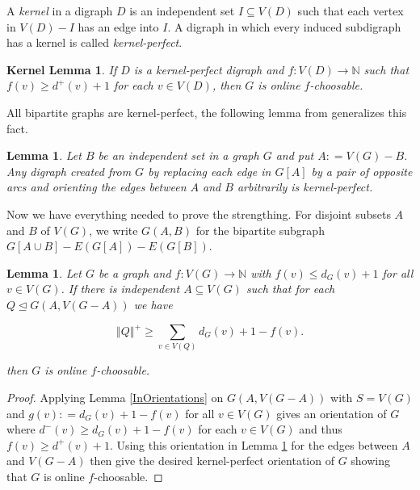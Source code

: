 \documentclass[12pt]{article}
\theoremstyle{plain}
\newtheorem{lem}[thm]{Lemma}
\newtheorem*{KernelLemma}{Kernel Lemma}
\theoremstyle{definition}
\theoremstyle{remark}
\newcommand{\IN}{\mathbb{N}}
\newcommand{\size}[1]{\left\Vert#1\right\Vert}
\newcommand{\func}[3]{#1\colon #2 \rightarrow #3}
\newcommand{\DefinedAs}{\mathrel{\mathop:}=}
\begin{document}
A \emph{kernel} in a digraph $D$ is an independent set $I \subseteq V(D)$ such that each vertex in $V(D) - I$ has an edge into $I$.  A digraph in which every induced subdigraph has a kernel is called \emph{kernel-perfect}.  

\begin{KernelLemma}
If $D$ is a kernel-perfect digraph and $\func{f}{V(D)}{\IN}$ such that $f(v) \geq d^+(v) + 1$ for each $v \in V(D)$, then $G$ is online $f$-choosable.
\end{KernelLemma}

All bipartite graphs are kernel-perfect, the following lemma from \cite{kostochkayancey2012ore} generalizes this fact.

\begin{lem}\label{KernelPerfect}
Let $B$ be an independent set in a graph $G$ and put $A \DefinedAs V(G) - B$.  Any digraph created from $G$ by replacing each edge in $G[A]$ by a pair of opposite arcs and orienting the edges between $A$ and $B$ arbitrarily is kernel-perfect.
\end{lem}

Now we have everything needed to prove the strengthing.  For disjoint subsets $A$ and $B$ of $V(G)$, we write $G(A, B)$ for the bipartite subgraph $G[A \cup B] - E(G[A]) - E(G[B])$.  

\begin{lem}\label{MicStrength}
Let $G$ be a graph and $\func{f}{V(G)}{\IN}$ with $f(v) \leq d_G(v) + 1$ for all $v \in V(G)$.  If there is independent $A \subseteq V(G)$ such that for each $Q \unlhd G(A, V(G-A))$ we have

\[\size{Q}^+ \geq  \sum_{v \in V(Q)} d_G(v) + 1 - f(v).\]

\noindent then $G$ is online $f$-choosable.
\end{lem}
\begin{proof}
Applying Lemma \ref{InOrientations} on $G(A, V(G-A))$ with $S = V(G)$ and $g(v) \DefinedAs d_G(v) + 1 - f(v)$ for all $v \in V(G)$ gives an orientation of $G$ where $d^-(v) \geq d_G(v) + 1 - f(v)$ for each $v \in V(G)$ and thus $f(v) \geq d^+(v) + 1$.  Using this orientation in Lemma \ref{KernelPerfect} for the edges between $A$ and $V(G-A)$ then give the desired kernel-perfect orientation of $G$ showing that $G$ is online $f$-choosable.
\end{proof}
\end{document}
